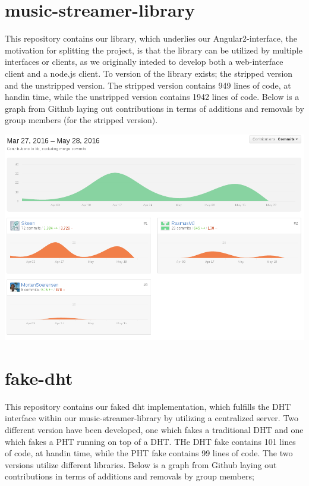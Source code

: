 \section{music-streamer-library}
\label{sec:appendix-music-streamer-library}
This repository contains our library, which underlies our Angular2-interface,
the motivation for splitting the project, is that the library can be utilized 
by multiple interfaces or clients, as we originally inteded to develop both a
web-interface client and a node.js client.
\newline\newline
To version of the library exists; the stripped version and the unstripped
version. The stripped version contains 949 lines of code, at handin time, while
the unstripped version contains 1942 lines of code.
\newline\newline
Below is a graph from Github laying out contributions in terms of additions and
removals by group members (for the stripped version).

\includegraphics[width=\linewidth]{gfx/Music-streamer-library}

\section{fake-dht}
This repository contains our faked dht implementation, which fulfills the DHT
interface within our music-streamer-library by utilizing a centralized server.
\newline
Two different version have been developed, one which fakes a traditional DHT
and one which fakes a PHT running on top of a DHT.
\newline\newline
THe DHT fake contains 101 lines of code, at handin time, while the PHT fake 
contains 99 lines of code. The two versions utilize different libraries.
\newline\newline
Below is a graph from Github laying out contributions in terms of additions and
removals by group members;

